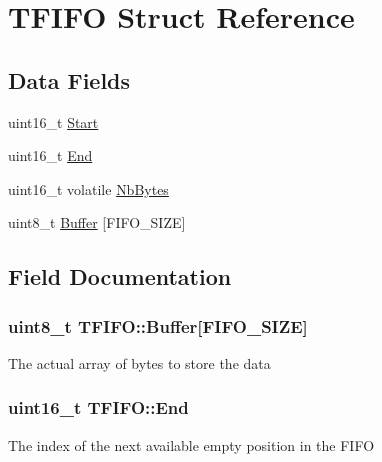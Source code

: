 \hypertarget{struct_t_f_i_f_o}{}\section{T\+F\+I\+F\+O Struct Reference}
\label{struct_t_f_i_f_o}
\subsection*{Data Fields}
\begin{DoxyCompactItemize}
\item 
uint16\+\_\+t \hyperlink{struct_t_f_i_f_o_a092a7559431a12616672354641908167}{Start}
\item 
uint16\+\_\+t \hyperlink{struct_t_f_i_f_o_a5063b875898a6f23a97aa3ca17f0544b}{End}
\item 
uint16\+\_\+t volatile \hyperlink{struct_t_f_i_f_o_ace00017651a266a66a93aa5220967611}{Nb\+Bytes}
\item 
uint8\+\_\+t \hyperlink{struct_t_f_i_f_o_a5a9d712880dc4f1d5571b96452cd85f8}{Buffer} \mbox{[}F\+I\+F\+O\+\_\+\+S\+I\+Z\+E\mbox{]}
\end{DoxyCompactItemize}


\subsection{Field Documentation}
\hypertarget{struct_t_f_i_f_o_a5a9d712880dc4f1d5571b96452cd85f8}{}
\subsubsection[{Buffer}]{\setlength{\rightskip}{0pt plus 5cm}uint8\+\_\+t T\+F\+I\+F\+O\+::\+Buffer\mbox{[}F\+I\+F\+O\+\_\+\+S\+I\+Z\+E\mbox{]}}\label{struct_t_f_i_f_o_a5a9d712880dc4f1d5571b96452cd85f8}
The actual array of bytes to store the data \hypertarget{struct_t_f_i_f_o_a5063b875898a6f23a97aa3ca17f0544b}{}
\subsubsection[{End}]{\setlength{\rightskip}{0pt plus 5cm}uint16\+\_\+t T\+F\+I\+F\+O\+::\+End}\label{struct_t_f_i_f_o_a5063b875898a6f23a97aa3ca17f0544b}
The index of the next available empty position in the F\+I\+F\+O \hypertarget{struct_t_f_i_f_o_ace00017651a266a66a93aa5220967611}{}
